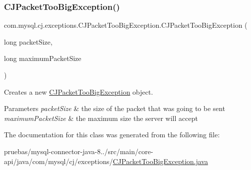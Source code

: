 \mbox{\label{classcom_1_1mysql_1_1cj_1_1exceptions_1_1_c_j_packet_too_big_exception_a2b7bde7117634bc639116d3977645c78}} 
\subsubsection{\texorpdfstring{C\+J\+Packet\+Too\+Big\+Exception()}{CJPacketTooBigException()}\hspace{0.1cm}{\footnotesize\ttfamily [5/5]}}
{\footnotesize\ttfamily com.\+mysql.\+cj.\+exceptions.\+C\+J\+Packet\+Too\+Big\+Exception.\+C\+J\+Packet\+Too\+Big\+Exception (\begin{DoxyParamCaption}\item[{long}]{packet\+Size,  }\item[{long}]{maximum\+Packet\+Size }\end{DoxyParamCaption})}

Creates a new \mbox{\hyperlink{classcom_1_1mysql_1_1cj_1_1exceptions_1_1_c_j_packet_too_big_exception}{C\+J\+Packet\+Too\+Big\+Exception}} object.


\begin{DoxyParams}{Parameters}
{\em packet\+Size} & the size of the packet that was going to be sent \\
\hline
{\em maximum\+Packet\+Size} & the maximum size the server will accept \\
\hline
\end{DoxyParams}


The documentation for this class was generated from the following file\+:\begin{DoxyCompactItemize}
\item 
pruebas/mysql-\/connector-\/java-\/8../src/main/core-\/api/java/com/mysql/cj/exceptions/\mbox{\hyperlink{_c_j_packet_too_big_exception_8java}{C\+J\+Packet\+Too\+Big\+Exception.\+java}}\end{DoxyCompactItemize}
